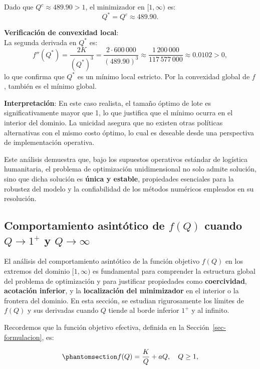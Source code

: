 \documentclass[
  spanish,
  us-letterpaper,
]{scrreprt}
\numberwithin{equation}{section}
\begin{document}
Dado que \(Q^c \approx 489.90 > 1\), el minimizador en \([1, \infty)\)
es: \[
Q^* = Q^c \approx 489.90.
\]

\textbf{Verificación de convexidad local}:\\
La segunda derivada en \(Q^*\) es: \[
f''(Q^*) = \frac{2K}{(Q^*)^3} = \frac{2 \cdot 600\,000}{(489.90)^3} \approx \frac{1\,200\,000}{117\,577\,000} \approx 0.0102 > 0,
\] lo que confirma que \(Q^*\) es un mínimo local estricto. Por la
convexidad global de \(f\), también es el mínimo global.

\textbf{Interpretación}: En este caso realista, el tamaño óptimo de lote
es significativamente mayor que 1, lo que justifica que el mínimo ocurra
en el interior del dominio. La unicidad asegura que no existen otras
políticas alternativas con el mismo costo óptimo, lo cual es deseable
desde una perspectiva de implementación operativa.

Este análisis demuestra que, bajo los supuestos operativos estándar de
logística humanitaria, el problema de optimización unidimensional no
solo admite solución, sino que dicha solución es \textbf{única y
estable}, propiedades esenciales para la robustez del modelo y la
confiabilidad de los métodos numéricos empleados en su resolución.

\subsection{\texorpdfstring{Comportamiento asintótico de \(f(Q)\) cuando
\(Q \to 1^+\) y
\(Q \to \infty\)}{Comportamiento asintótico de f(Q) cuando Q \textbackslash to 1\^{}+ y Q \textbackslash to \textbackslash infty}}\label{comportamiento-asintuxf3tico-de-fq-cuando-q-to-1-y-q-to-infty}

El análisis del comportamiento asintótico de la función objetivo
\(f(Q)\) en los extremos del dominio \([1, \infty)\) es fundamental para
comprender la estructura global del problema de optimización y para
justificar propiedades como \textbf{coercividad}, \textbf{acotación
inferior}, y la \textbf{localización del minimizador} en el interior o
la frontera del dominio. En esta sección, se estudian rigurosamente los
límites de \(f(Q)\) y sus derivadas cuando \(Q\) tiende al borde
inferior \(1^+\) y al infinito.

Recordemos que la función objetivo efectiva, definida en la
Sección~\ref{sec-formulacion}, es:

\begin{equation}\phantomsection\label{eq-fQ_25_4}{
f(Q) = \frac{K}{Q} + a Q,
\quad
Q \geq 1,
}\end{equation}
\end{document}
